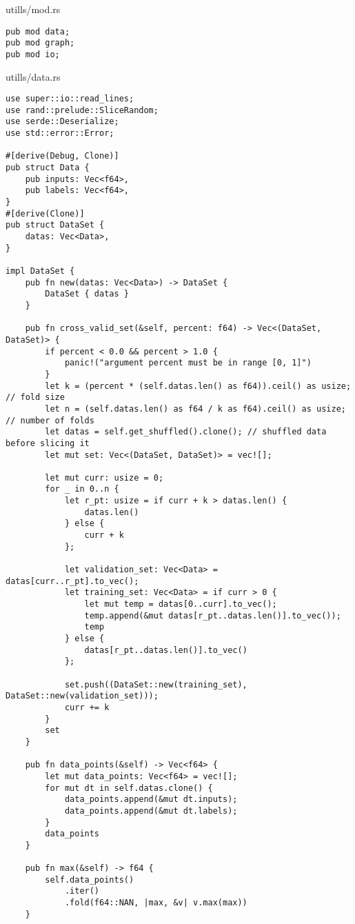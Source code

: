 \noindent utills/mod.rs
\begin{verbatim}        
pub mod data;
pub mod graph;
pub mod io;
\end{verbatim}
\noindent utills/data.rs
\begin{verbatim}        
use super::io::read_lines;
use rand::prelude::SliceRandom;
use serde::Deserialize;
use std::error::Error;

#[derive(Debug, Clone)]
pub struct Data {
    pub inputs: Vec<f64>,
    pub labels: Vec<f64>,
}
#[derive(Clone)]
pub struct DataSet {
    datas: Vec<Data>,
}

impl DataSet {
    pub fn new(datas: Vec<Data>) -> DataSet {
        DataSet { datas }
    }

    pub fn cross_valid_set(&self, percent: f64) -> Vec<(DataSet, DataSet)> {
        if percent < 0.0 && percent > 1.0 {
            panic!("argument percent must be in range [0, 1]")
        }
        let k = (percent * (self.datas.len() as f64)).ceil() as usize; // fold size
        let n = (self.datas.len() as f64 / k as f64).ceil() as usize; // number of folds
        let datas = self.get_shuffled().clone(); // shuffled data before slicing it
        let mut set: Vec<(DataSet, DataSet)> = vec![];

        let mut curr: usize = 0;
        for _ in 0..n {
            let r_pt: usize = if curr + k > datas.len() {
                datas.len()
            } else {
                curr + k
            };

            let validation_set: Vec<Data> = datas[curr..r_pt].to_vec();
            let training_set: Vec<Data> = if curr > 0 {
                let mut temp = datas[0..curr].to_vec();
                temp.append(&mut datas[r_pt..datas.len()].to_vec());
                temp
            } else {
                datas[r_pt..datas.len()].to_vec()
            };

            set.push((DataSet::new(training_set), DataSet::new(validation_set)));
            curr += k
        }
        set
    }

    pub fn data_points(&self) -> Vec<f64> {
        let mut data_points: Vec<f64> = vec![];
        for mut dt in self.datas.clone() {
            data_points.append(&mut dt.inputs);
            data_points.append(&mut dt.labels);
        }
        data_points
    }

    pub fn max(&self) -> f64 {
        self.data_points()
            .iter()
            .fold(f64::NAN, |max, &v| v.max(max))
    }


\end{verbatim}
